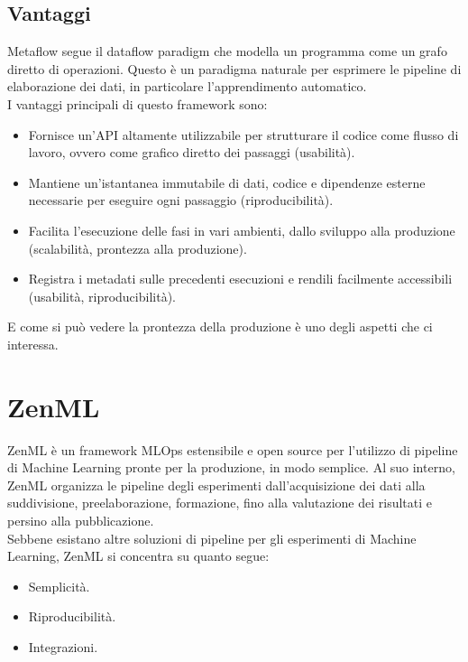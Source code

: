 \documentclass[12pt,a4paper]{report}
\begin{document}
\subsection{Vantaggi}
Metaflow segue il dataflow paradigm che modella un programma come un grafo diretto di operazioni. Questo è un paradigma naturale per esprimere le pipeline di elaborazione dei dati, in particolare l'apprendimento automatico.\\
I vantaggi principali di questo framework sono: \cite{MetaFLow}
\begin{itemize}
    \item Fornisce un'API altamente utilizzabile per strutturare il codice come flusso di lavoro, ovvero come grafico diretto dei passaggi (usabilità).
    \item Mantiene un'istantanea immutabile di dati, codice e dipendenze esterne necessarie per eseguire ogni passaggio (riproducibilità).
    \item Facilita l'esecuzione delle fasi in vari ambienti, dallo sviluppo alla produzione (scalabilità, prontezza alla produzione).
    \item Registra i metadati sulle precedenti esecuzioni e rendili facilmente accessibili (usabilità, riproducibilità).
\end{itemize}

E come si può vedere la prontezza della produzione è uno degli aspetti che ci interessa.

\section{ZenML}
ZenML è un framework MLOps estensibile e open source per l'utilizzo di pipeline di Machine Learning pronte per la produzione, in modo semplice. Al suo interno, ZenML organizza le pipeline degli esperimenti dall'acquisizione dei dati alla suddivisione, preelaborazione, formazione, fino alla valutazione dei risultati e persino alla pubblicazione. \cite{ZenML}\\
Sebbene esistano altre soluzioni di pipeline per gli esperimenti di Machine Learning, ZenML si concentra su quanto segue:
\begin{itemize}
    \item Semplicità.
    \item Riproducibilità.
    \item Integrazioni.
\end{itemize}
\end{document}

